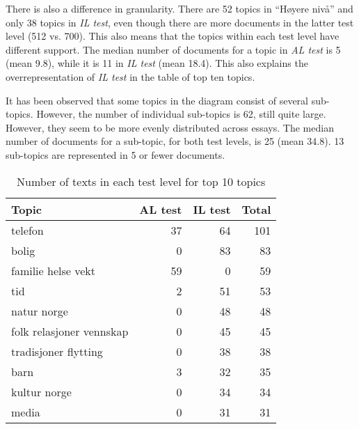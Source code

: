 There is also a difference in granularity. There are 52 topics in ``Høyere
nivå'' and only 38 topics in \emph{IL test}, even though there are more
documents in the latter test level (512 vs. 700). This also means that the
topics within each test level have different support. The median number of
documents for a topic in \emph{AL test} is 5 (mean 9.8), while it is 11 in
\emph{IL test} (mean 18.4). This also explains the overrepresentation of
\emph{IL test} in the table of top ten topics.

It has been observed that some topics in the diagram consist of several
sub-topics. However, the number of individual sub-topics is 62, still quite
large. However, they seem to be more evenly distributed across essays. The
median number of documents for a sub-topic, for both test levels, is 25 (mean
34.8). 13 sub-topics are represented in 5 or fewer documents.

\begin{table}
  \centering
  \begin{tabular}{lrrr}
    \toprule
    Topic                    & AL test & IL test & Total \\
    \midrule
    telefon                  &      37 &      64 &   101 \\
    bolig                    &       0 &      83 &    83 \\
    familie helse vekt       &      59 &       0 &    59 \\
    tid                      &       2 &      51 &    53 \\
    natur norge              &       0 &      48 &    48 \\
    folk relasjoner vennskap &       0 &      45 &    45 \\
    tradisjoner flytting     &       0 &      38 &    38 \\
    barn                     &       3 &      32 &    35 \\
    kultur norge             &       0 &      34 &    34 \\
    media                    &       0 &      31 &    31 \\
    \bottomrule
  \end{tabular}
  \caption{Number of texts in each test level for top 10 topics}
  \label{texts-per-topic}
\end{table}

